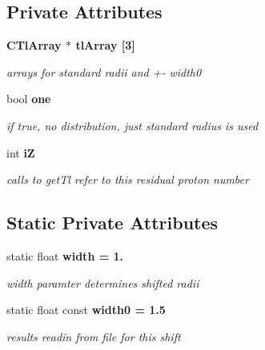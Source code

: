 \subsection*{Private Attributes}
\begin{CompactItemize}
\item 
\bf{CTl\-Array} $\ast$ \bf{tl\-Array} [3]\label{classCTlBarDist_b1b034052d1d891b283178cab3e02199}

\begin{CompactList}\small\item\em arrays for standard radii and +- width0 \item\end{CompactList}\item 
bool \bf{one}\label{classCTlBarDist_8ea42d0d19f5d9de689b55b02cd352b5}

\begin{CompactList}\small\item\em if true, no distribution, just standard radius is used \item\end{CompactList}\item 
int \bf{i\-Z}\label{classCTlBarDist_a0d1e4422f41890e116c37ea4b60bf61}

\begin{CompactList}\small\item\em calls to get\-Tl refer to this residual proton number \item\end{CompactList}\end{CompactItemize}
\subsection*{Static Private Attributes}
\begin{CompactItemize}
\item 
static float \bf{width} = 1.\label{classCTlBarDist_5c3f55537cedd466a5efc497b26f400f}

\begin{CompactList}\small\item\em width paramter determines shifted radii \item\end{CompactList}\item 
static float const \bf{width0} = 1.5\label{classCTlBarDist_9df6198d2b6b4801cba17daa1a000624}

\begin{CompactList}\small\item\em results readin from file for this shift \item\end{CompactList}\end{CompactItemize}


